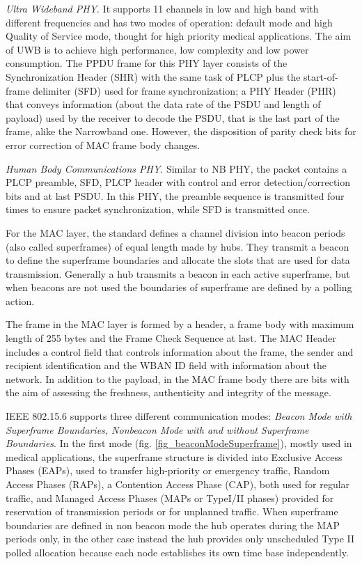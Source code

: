 \documentclass[conference]{IEEEtran}
\begin{document}
\textit{Ultra Wideband PHY}. It supports 11 channels in low and high band with different frequencies and has two modes of operation: default mode and high Quality of Service mode, thought for high priority medical applications. The aim of UWB is to achieve high performance, low complexity and low power consumption. The PPDU frame for this PHY layer consists of the Synchronization Header (SHR) with the same task of PLCP plus the start-of-frame delimiter (SFD) used for frame synchronization; a PHY Header (PHR) that conveys information (about the data rate of the PSDU and length of payload) used by the receiver to decode the PSDU, that is the last part of the frame, alike the Narrowband one. However, the disposition of parity check bits for error correction of MAC frame body changes.
\newline

\textit{Human Body Communications PHY}. Similar to NB PHY, the packet contains a PLCP preamble, SFD, PLCP header with control and error detection/correction bits and at last PSDU. In this PHY, the preamble sequence is transmitted four times to ensure packet synchronization, while SFD is transmitted once.
\newline

For the MAC layer, the standard defines a channel division into beacon periods (also called superframes) of equal length made by hubs. They transmit a beacon to define the superframe boundaries and allocate the slots that are used for data transmission. Generally a hub transmits a beacon in each active superframe, but when beacons are not used the boundaries of superframe are defined by a polling action.

The frame in the MAC layer is formed by a header, a frame body with maximum length of 255 bytes and the Frame Check Sequence at last. The MAC Header includes a control field that controls information about the frame, the sender and recipient identification and the WBAN ID field with information about the network. In addition to the payload, in the MAC frame body there are bits with the aim of assessing the freshness, authenticity and integrity of the message.

IEEE 802.15.6 supports three different communication modes: \textit{Beacon Mode with Superframe Boundaries, Nonbeacon Mode with and without Superframe Boundaries}. In the first mode (fig. \ref{fig_beaconModeSuperframe}), mostly used in medical applications, the superframe structure is divided into Exclusive Access Phases (EAPs), used to transfer high-priority or emergency traffic, Random Access Phases (RAPs), a Contention Access Phase (CAP), both used for regular traffic, and Managed Access Phases (MAPs or TypeI/II phases) provided for reservation of transmission periods or for unplanned traffic. When superframe boundaries are defined in non beacon mode the hub operates during the MAP periods only, in the other case instead the hub provides only unscheduled Type II polled allocation because each node establishes its own time base independently.
\end{document}
